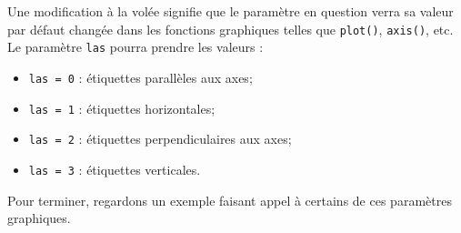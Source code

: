 \documentclass[]{article}
\providecommand{\tightlist}{%
  \setlength{\itemsep}{0pt}\setlength{\parskip}{0pt}}
\begin{document}
Une modification à la volée signifie que le paramètre en question verra sa valeur par défaut changée dans les fonctions graphiques telles que \texttt{plot()}, \texttt{axis()}, etc. Le paramètre \texttt{las} pourra prendre les valeurs :

\begin{itemize}
\tightlist
\item
  \texttt{las\ =\ 0} : étiquettes parallèles aux axes;
\item
  \texttt{las\ =\ 1} : étiquettes horizontales;
\item
  \texttt{las\ =\ 2} : étiquettes perpendiculaires aux axes;
\item
  \texttt{las\ =\ 3} : étiquettes verticales.
\end{itemize}

Pour terminer, regardons un exemple faisant appel à certains de ces paramètres graphiques.
\end{document}

